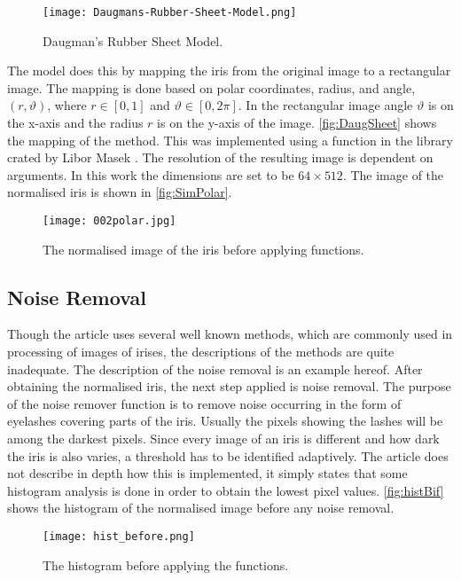 \begin{figure}[h]
\centering
\texttt{[image: Daugmans-Rubber-Sheet-Model.png]}
\caption{Daugman's Rubber Sheet Model. \citep{Misztal2012}}
\label{fig:DaugSheet}
\end{figure}

The model does this by mapping the iris from the original image to a rectangular image. The mapping is done based on polar coordinates, radius, and angle, $(r,\vartheta)$, where $r\in[0,1]$ and $\vartheta\in[0,2\pi]$. In the rectangular image angle $\vartheta$ is on the x-axis and the radius $r$ is on the y-axis of the image. \autoref{fig:DaugSheet} shows the mapping of the method. This was implemented using a function in the library crated by Libor Masek \citep{LiborMasek2003}. The resolution of the resulting image is dependent on arguments. In this work the dimensions are set to be $64\times512$. The image of the normalised iris is shown in \autoref{fig:SimPolar}. 

\begin{figure}[h]
\centering
\texttt{[image: 002polar.jpg]}
\caption{The normalised image of the iris before applying functions.}
\label{fig:SimPolar}
\end{figure}

\subsection{Noise Removal}
Though the article uses several well known methods, which are commonly used in processing of images of irises, the descriptions of the methods are quite inadequate. The description of the noise removal is an example hereof. After obtaining the normalised iris, the next step applied is noise removal. The purpose of the noise remover function is to remove noise occurring in the form of eyelashes covering parts of the iris. Usually the pixels showing the lashes will be among the darkest pixels. Since every image of an iris is different and how dark the iris is also varies, a threshold has to be identified adaptively. The article does not describe in depth how this is implemented, it simply states that some histogram analysis is done in order to obtain the lowest pixel values. \autoref{fig:histBif} shows the histogram of the normalised image before any noise removal. 

\begin{figure}[H]
	\centering
	\texttt{[image: hist\_before.png]}
	\caption{The histogram before applying the functions.}
	\label{fig:histBif}
\end{figure}

